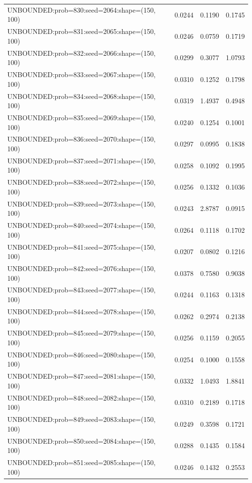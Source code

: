 \begin{longtable}{lccc}
UNBOUNDED:prob=830:seed=2064:shape=(150, 100) &   0.0244 &  0.1190 &  0.1745 \\
UNBOUNDED:prob=831:seed=2065:shape=(150, 100) &   0.0246 &  0.0759 &  0.1719 \\
UNBOUNDED:prob=832:seed=2066:shape=(150, 100) &   0.0299 &  0.3077 &  1.0793 \\
UNBOUNDED:prob=833:seed=2067:shape=(150, 100) &   0.0310 &  0.1252 &  0.1798 \\
UNBOUNDED:prob=834:seed=2068:shape=(150, 100) &   0.0319 &  1.4937 &  0.4948 \\
UNBOUNDED:prob=835:seed=2069:shape=(150, 100) &   0.0240 &  0.1254 &  0.1001 \\
UNBOUNDED:prob=836:seed=2070:shape=(150, 100) &   0.0297 &  0.0995 &  0.1838 \\
UNBOUNDED:prob=837:seed=2071:shape=(150, 100) &   0.0258 &  0.1092 &  0.1995 \\
UNBOUNDED:prob=838:seed=2072:shape=(150, 100) &   0.0256 &  0.1332 &  0.1036 \\
UNBOUNDED:prob=839:seed=2073:shape=(150, 100) &   0.0243 &  2.8787 &  0.0915 \\
UNBOUNDED:prob=840:seed=2074:shape=(150, 100) &   0.0264 &  0.1118 &  0.1702 \\
UNBOUNDED:prob=841:seed=2075:shape=(150, 100) &   0.0207 &  0.0802 &  0.1216 \\
UNBOUNDED:prob=842:seed=2076:shape=(150, 100) &   0.0378 &  0.7580 &  0.9038 \\
UNBOUNDED:prob=843:seed=2077:shape=(150, 100) &   0.0244 &  0.1163 &  0.1318 \\
UNBOUNDED:prob=844:seed=2078:shape=(150, 100) &   0.0262 &  0.2974 &  0.2138 \\
UNBOUNDED:prob=845:seed=2079:shape=(150, 100) &   0.0256 &  0.1159 &  0.2055 \\
UNBOUNDED:prob=846:seed=2080:shape=(150, 100) &   0.0254 &  0.1000 &  0.1558 \\
UNBOUNDED:prob=847:seed=2081:shape=(150, 100) &   0.0332 &  1.0493 &  1.8841 \\
UNBOUNDED:prob=848:seed=2082:shape=(150, 100) &   0.0310 &  0.2189 &  0.1718 \\
UNBOUNDED:prob=849:seed=2083:shape=(150, 100) &   0.0249 &  0.3598 &  0.1721 \\
UNBOUNDED:prob=850:seed=2084:shape=(150, 100) &   0.0288 &  0.1435 &  0.1584 \\
UNBOUNDED:prob=851:seed=2085:shape=(150, 100) &   0.0246 &  0.1432 &  0.2553 \\

\end{longtable}
